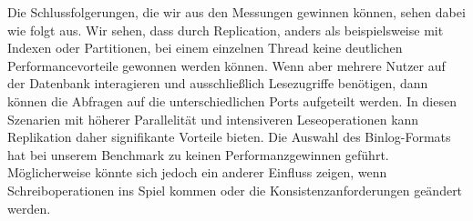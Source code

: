 Die Schlussfolgerungen, die wir aus den Messungen gewinnen können, sehen dabei wie folgt aus.
Wir sehen, dass durch Replication, anders als beispielsweise mit Indexen oder Partitionen, bei einem einzelnen Thread keine deutlichen Performancevorteile gewonnen werden können.
Wenn aber mehrere Nutzer auf der Datenbank interagieren und ausschließlich Lesezugriffe benötigen, dann können die Abfragen auf die unterschiedlichen Ports aufgeteilt werden.
In diesen Szenarien mit höherer Parallelität und intensiveren Leseoperationen kann Replikation daher signifikante Vorteile bieten.
Die Auswahl des Binlog-Formats hat bei unserem Benchmark zu keinen Performanzgewinnen geführt.
Möglicherweise könnte sich jedoch ein anderer Einfluss zeigen, wenn Schreiboperationen ins Spiel kommen oder die Konsistenzanforderungen geändert werden.
